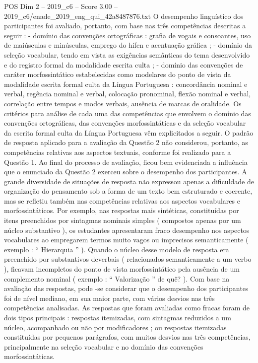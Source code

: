 \begin{textsample}{POS Dim 2 – 2019\_c6 – Score 3.00 – 2019\_c6/enade\_2019\_eng\_qui\_42a8487876.txt}
O desempenho linguístico dos participantes foi avaliado, portanto, com base nas três competências descritas a seguir : - domínio das convenções ortográficas : grafia de vogais e consoantes, uso de maiúsculas e minúsculas, emprego do hífen e acentuação gráfica ; - domínio da seleção vocabular, tendo em vista as exigências semânticas do tema desenvolvido e do registro formal da modalidade escrita culta ; - domínio das convenções de caráter morfossintático estabelecidas como modelares do ponto de vista da modalidade escrita formal culta da Língua Portuguesa : concordância nominal e verbal, regência nominal e verbal, colocação pronominal, flexão nominal e verbal, correlação entre tempos e modos verbais, ausência de marcas de oralidade.
Os critérios para análise de cada uma das competências que envolvem o domínio das convenções ortográficas, das convenções morfossintáticas e da seleção vocabular da escrita formal culta da Língua Portuguesa vêm explicitados a seguir.
O padrão de resposta aplicado para a avaliação da Questão 2 não considerou, portanto, as competências relativas aos aspectos textuais, conforme foi realizado para a Questão 1.
Ao final do processo de avaliação, ficou bem evidenciada a influência que o enunciado da Questão 2 exerceu sobre o desempenho dos participantes.
A grande diversidade de situações de resposta não expressou apenas a dificuldade de organização do pensamento sob a forma de um texto bem estruturado e coerente, mas se refletiu também nas competências relativas aos aspectos vocabulares e morfossintáticos.
Por exemplo, nas respostas mais sintéticas, constituídas por itens preenchidos por sintagmas nominais simples ( compostos apenas por um núcleo substantivo ), os estudantes apresentaram fraco desempenho nos aspectos vocabulares ao empregarem termos muito vagos ou imprecisos semanticamente ( exemplo : “ Hierarquia ” ).
Quando o núcleo desse modelo de resposta era preenchido por substantivos deverbais ( relacionados semanticamente a um verbo ), ficavam incompletos do ponto de vista morfossintático pela ausência de um complemento nominal ( exemplo : “ Valorização ” de quê? ).
Com base na avaliação das respostas, pode -se considerar que o desempenho dos participantes foi de nível mediano, em sua maior parte, com vários desvios nas três competências analisadas.
As respostas que foram avaliadas como fracas foram de dois tipos principais : respostas itemizadas, com sintagmas reduzidos a um núcleo, acompanhado ou não por modificadores ; ou respostas itemizadas constituídas por pequenos parágrafos, com muitos desvios nas três competências, principalmente na seleção vocabular e no domínio das convenções morfossintáticas.

\end{textsample}
